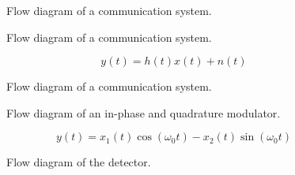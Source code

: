 \begin{figure}[h]
	\centering
	
	\caption{Flow diagram of a communication system.}
\end{figure}

\begin{figure}[h]
	\centering
	
	\caption{Flow diagram of a communication system.}
\end{figure}
\begin{equation}
	y(t)
	=
	h(t)x(t)
	+
	n(t)
\end{equation}

\begin{figure}[h]
	\centering
	
	\caption{Flow diagram of a communication system.}
\end{figure}

\begin{figure}[h]
	\centering
	
	\caption{Flow diagram of an in-phase and quadrature modulator.}
\end{figure}
\begin{equation}
	y(t)
	=
	x_1(t)
	\cos(\omega_0t)
	-
	x_2(t)
	\sin(\omega_0t)
\end{equation}

\begin{figure}[h]
	\centering
	
	\caption{Flow diagram of the detector.}
\end{figure}